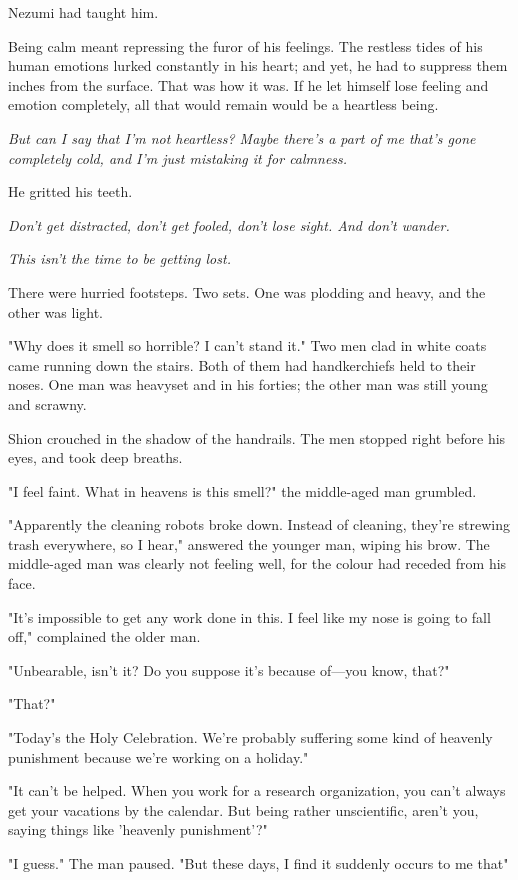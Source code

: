 Nezumi had taught him.

Being calm meant repressing the furor of his feelings. The restless
tides of his human emotions lurked constantly in his heart; and yet, he
had to suppress them inches from the surface. That was how it was. If he
let himself lose feeling and emotion completely, all that would remain
would be a heartless being.

\emph{But can I say that I'm not heartless? Maybe there's a part of me that's
gone completely cold, and I'm just mistaking it for calmness.}

He gritted his teeth.

\emph{Don't get distracted, don't get fooled, don't lose sight. And don't
wander.}

\emph{This isn't the time to be getting lost.}

There were hurried footsteps. Two sets. One was plodding and heavy, and
the other was light.

"Why does it smell so horrible? I can't stand it." Two men clad in white
coats came running down the stairs. Both of them had handkerchiefs held
to their noses. One man was heavyset and in his forties; the other man
was still young and scrawny.

Shion crouched in the shadow of the handrails. The men stopped right
before his eyes, and took deep breaths.

"I feel faint. What in heavens is this smell?" the middle-aged man
grumbled.

"Apparently the cleaning robots broke down. Instead of cleaning, they're
strewing trash everywhere, so I hear," answered the younger man, wiping
his brow. The middle-aged man was clearly not feeling well, for the
colour had receded from his face.

"It's impossible to get any work done in this. I feel like my nose is
going to fall off," complained the older man.

"Unbearable, isn't it? Do you suppose it's because of---you know, that?"

"That?"

"Today's the Holy Celebration. We're probably suffering some kind of
heavenly punishment because we're working on a holiday."

"It can't be helped. When you work for a research organization, you
can't always get your vacations by the calendar. But being rather
unscientific, aren't you, saying things like 'heavenly punishment'?"

"I guess." The man paused. "But these days, I find it suddenly occurs to
me that\el "

